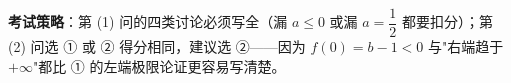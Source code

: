 \begin{answer}
\begin{gktip}
\textbf{考试策略}：第 (1) 问的四类讨论必须写全（漏 $a\le0$ 或漏 $a=\dfrac12$ 都要扣分）；第 (2) 问选 ① 或 ② 得分相同，建议选 ②——因为 $f(0)=b-1<0$ 与"右端趋于 $+\infty$"都比 ① 的左端极限论证更容易写清楚。
\end{gktip}



\end{answer}